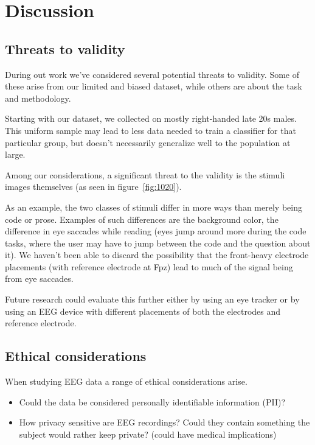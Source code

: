 \section{Discussion}

\subsection{Threats to validity}

    During out work we've considered several potential threats to validity. Some of these arise from our limited and biased dataset, while others are about the task and methodology.

    Starting with our dataset, we collected on mostly right-handed late 20s males. This uniform sample may lead to less data needed to train a classifier for that particular group, but doesn't necessarily generalize well to the population at large.

    Among our considerations, a significant threat to the validity is the stimuli images themselves (as seen in figure~\ref{fig:1020}). 

    As an example, the two classes of stimuli differ in more ways than merely being code or prose. Examples of such differences are the background color, the difference in eye saccades while reading (eyes jump around more during the code tasks, where the user may have to jump between the code and the question about it). We haven't been able to discard the possibility that the front-heavy electrode placements (with reference electrode at Fpz) lead to much of the signal being from eye saccades. 

    Future research could evaluate this further either by using an eye tracker or by using an EEG device with different placements of both the electrodes and reference electrode.


\subsection{Ethical considerations}

    When studying EEG data a range of ethical considerations arise. 

    \begin{itemize}
        \item Could the data be considered personally identifiable information (PII)? 
        \item How privacy sensitive are EEG recordings? Could they contain something the subject would rather keep private? (could have medical implications)
    \end{itemize}

